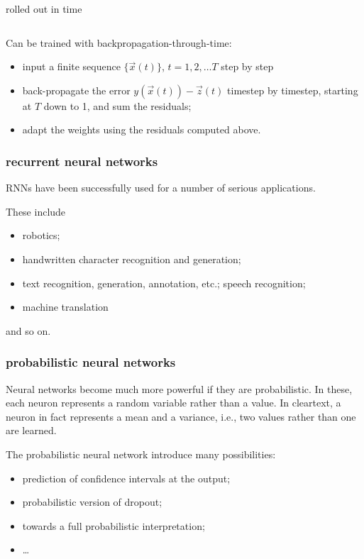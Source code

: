\documentclass[USenglish,pdftex,compress,10pt,svgnamesi,handout]{beamer}
\begin{document}
\begin{frame}
\begin{columns}
\centerline{rolled out in time}
\end{columns}
\vskip5mm
Can be trained with backpropagation-through-time:
\begin{itemize}
\item input a finite sequence  $\{\Vec x(t)\}$, $t = 1, 2, \dots T$ step by step
\item back-propagate the error $y(\Vec x(t)) - \Vec z(t)$ timestep by timestep, starting at $T$ down to 1, and sum the residuals;
\item adapt the weights using the residuals computed above.
\end{itemize}
\end{frame}



\begin{frame}
\frametitle{recurrent neural networks}
RNNs have been successfully used for a number of serious applications.  

These include 
\begin{itemize}
 \item robotics;
 \item handwritten character recognition and generation;
 \item text recognition, generation, annotation, etc.; speech recognition;
 \item machine translation
\end{itemize}
and so on.

\end{frame}








\begin{frame}
\frametitle{probabilistic neural networks}

Neural networks become much more powerful if they are probabilistic.
In these, each neuron represents a random variable rather than a value.
In cleartext, a neuron in fact represents a mean and a variance, i.e., two values rather than one are learned.

The probabilistic neural network introduce many possibilities:
\begin{itemize}
  \item prediction of confidence intervals at the output;
  \item probabilistic version of dropout;
  \item towards a full probabilistic interpretation;
  \item \dots
\end{itemize}

\end{frame}
\end{document}

